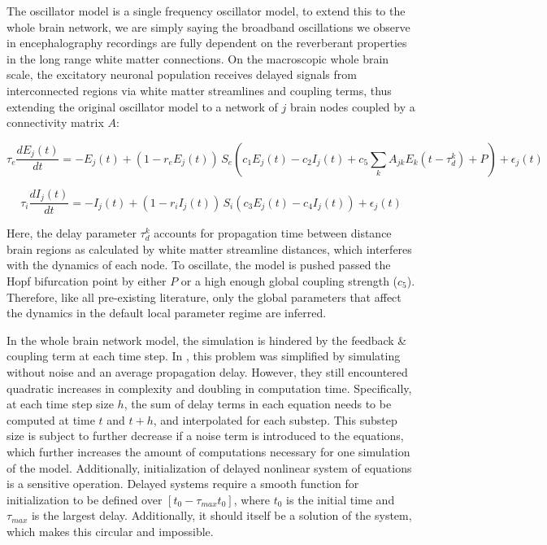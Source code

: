 The oscillator model is a single frequency oscillator model, to extend this to the whole brain network, we are simply saying the broadband oscillations we observe in encephalography recordings are fully dependent on the reverberant properties in the long range white matter connections. On the macroscopic whole brain scale, the excitatory neuronal population receives delayed signals from interconnected regions via white matter streamlines and coupling terms, thus extending the original oscillator model to a network of $j$ brain nodes coupled by a connectivity matrix $A$:

\begin{equation}
    \label{eq:wcn_ex}
\tau_e \frac{dE_{j}(t)}{dt} = -E_{j}(t) + (1 - r_e E_{j}(t)) \, S_e(c_1 E_{j}(t) - c_2 I_{j}(t) + c_5 \sum_{k} A_{jk} E_{k}(t - \tau_d^k) + P) + \epsilon_{j} (t)
\end{equation}

\begin{equation}
\label{eq:wcn_in}
\tau_i \frac{dI_{j}(t)}{dt} = -I_{j}(t) + (1 - r_i I_{j}(t)) \, S_i(c_3 E_{j}(t) - c_4 I_{j}(t)) + \epsilon_{j} (t)
\end{equation}

Here, the delay parameter $\tau_d^k$ accounts for propagation time between distance brain regions as calculated by white matter streamline distances, which interferes with the dynamics of each node. To oscillate, the model is pushed passed the Hopf bifurcation point by either $P$ or a high enough global coupling strength  ($c_5$). Therefore,  like all pre-existing literature, only the global parameters that affect the dynamics in the default local parameter regime are inferred. 

In the whole brain network model, the simulation is hindered by the feedback \& coupling term at each time step. In \cite{hadida_bayesian_2018}, this problem was simplified by simulating without noise and an average propagation delay. However, they still encountered quadratic increases in complexity and doubling in computation time. Specifically, at each time step size $h$, the sum of delay terms in each equation needs to be computed at time $t$ and $t+h$, and interpolated for each substep. This substep size is subject to further decrease if a noise term is introduced to the equations, which further increases the amount of computations necessary for one simulation of the model. Additionally, initialization of delayed nonlinear system of equations is a sensitive operation. Delayed systems require a smooth function for initialization to be defined over $[t_0 - \tau_{max} t_0]$, where $t_0$ is the initial time and $\tau_{max}$ is the largest delay. Additionally, it should itself be a solution of the system, which makes this circular and impossible. 

